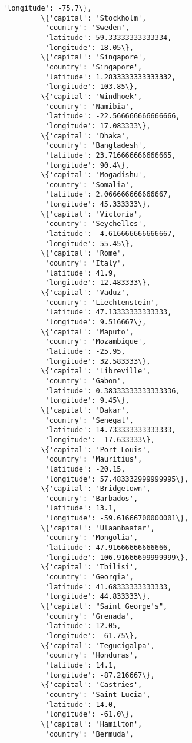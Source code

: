 \documentclass[11pt]{article}
\begin{document}
\begin{Verbatim}[commandchars=\\\{\}]
          'longitude': -75.7\},
         \{'capital': 'Stockholm',
          'country': 'Sweden',
          'latitude': 59.33333333333334,
          'longitude': 18.05\},
         \{'capital': 'Singapore',
          'country': 'Singapore',
          'latitude': 1.2833333333333332,
          'longitude': 103.85\},
         \{'capital': 'Windhoek',
          'country': 'Namibia',
          'latitude': -22.566666666666666,
          'longitude': 17.083333\},
         \{'capital': 'Dhaka',
          'country': 'Bangladesh',
          'latitude': 23.716666666666665,
          'longitude': 90.4\},
         \{'capital': 'Mogadishu',
          'country': 'Somalia',
          'latitude': 2.066666666666667,
          'longitude': 45.333333\},
         \{'capital': 'Victoria',
          'country': 'Seychelles',
          'latitude': -4.616666666666667,
          'longitude': 55.45\},
         \{'capital': 'Rome',
          'country': 'Italy',
          'latitude': 41.9,
          'longitude': 12.483333\},
         \{'capital': 'Vaduz',
          'country': 'Liechtenstein',
          'latitude': 47.13333333333333,
          'longitude': 9.516667\},
         \{'capital': 'Maputo',
          'country': 'Mozambique',
          'latitude': -25.95,
          'longitude': 32.583333\},
         \{'capital': 'Libreville',
          'country': 'Gabon',
          'latitude': 0.38333333333333336,
          'longitude': 9.45\},
         \{'capital': 'Dakar',
          'country': 'Senegal',
          'latitude': 14.733333333333333,
          'longitude': -17.633333\},
         \{'capital': 'Port Louis',
          'country': 'Mauritius',
          'latitude': -20.15,
          'longitude': 57.483332999999995\},
         \{'capital': 'Bridgetown',
          'country': 'Barbados',
          'latitude': 13.1,
          'longitude': -59.61666700000001\},
         \{'capital': 'Ulaanbaatar',
          'country': 'Mongolia',
          'latitude': 47.91666666666666,
          'longitude': 106.91666699999999\},
         \{'capital': 'Tbilisi',
          'country': 'Georgia',
          'latitude': 41.68333333333333,
          'longitude': 44.833333\},
         \{'capital': "Saint George's",
          'country': 'Grenada',
          'latitude': 12.05,
          'longitude': -61.75\},
         \{'capital': 'Tegucigalpa',
          'country': 'Honduras',
          'latitude': 14.1,
          'longitude': -87.216667\},
         \{'capital': 'Castries',
          'country': 'Saint Lucia',
          'latitude': 14.0,
          'longitude': -61.0\},
         \{'capital': 'Hamilton',
          'country': 'Bermuda',

\end{Verbatim}
\end{document}
